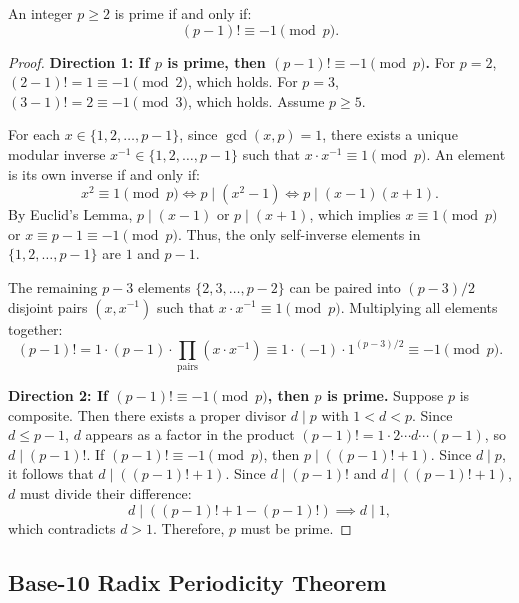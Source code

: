 \begin{theorem}
\label{thm:wilson}
\leanok
An integer $p \ge 2$ is prime if and only if:
\begin{equation}
\label{eq:wilson}
(p-1)! \equiv -1 \pmod p.
\end{equation}
\end{theorem}

\begin{proof}
\leanok
\textbf{Direction 1: If $p$ is prime, then $(p-1)! \equiv -1 \pmod p$.}
For $p = 2$, $(2-1)! = 1 \equiv -1 \pmod 2$, which holds. For $p = 3$, $(3-1)! = 2 \equiv -1 \pmod 3$, which holds. Assume $p \ge 5$.

For each $x \in \{1, 2, \dots, p-1\}$, since $\gcd(x, p) = 1$, there exists a unique modular inverse $x^{-1} \in \{1, 2, \dots, p-1\}$ such that $x \cdot x^{-1} \equiv 1 \pmod p$.
An element is its own inverse if and only if:
$$x^2 \equiv 1 \pmod p \iff p \mid (x^2 - 1) \iff p \mid (x - 1)(x + 1).$$
By Euclid's Lemma, $p \mid (x - 1)$ or $p \mid (x + 1)$, which implies $x \equiv 1 \pmod p$ or $x \equiv p-1 \equiv -1 \pmod p$.
Thus, the only self-inverse elements in $\{1, 2, \dots, p-1\}$ are $1$ and $p-1$.

The remaining $p - 3$ elements $\{2, 3, \dots, p-2\}$ can be paired into $(p-3)/2$ disjoint pairs $(x, x^{-1})$ such that $x \cdot x^{-1} \equiv 1 \pmod p$. Multiplying all elements together:
$$(p-1)! = 1 \cdot (p-1) \cdot \prod_{\text{pairs}} (x \cdot x^{-1}) \equiv 1 \cdot (-1) \cdot 1^{(p-3)/2} \equiv -1 \pmod p.$$

\textbf{Direction 2: If $(p-1)! \equiv -1 \pmod p$, then $p$ is prime.}
Suppose $p$ is composite. Then there exists a proper divisor $d \mid p$ with $1 < d < p$.
Since $d \le p-1$, $d$ appears as a factor in the product $(p-1)! = 1 \cdot 2 \cdots d \cdots (p-1)$, so $d \mid (p-1)!$.
If $(p-1)! \equiv -1 \pmod p$, then $p \mid ((p-1)! + 1)$. Since $d \mid p$, it follows that $d \mid ((p-1)! + 1)$.
Since $d \mid (p-1)!$ and $d \mid ((p-1)! + 1)$, $d$ must divide their difference:
$$d \mid ((p-1)! + 1 - (p-1)!) \implies d \mid 1,$$
which contradicts $d > 1$. Therefore, $p$ must be prime.
\end{proof}

\subsection{Base-10 Radix Periodicity Theorem}

